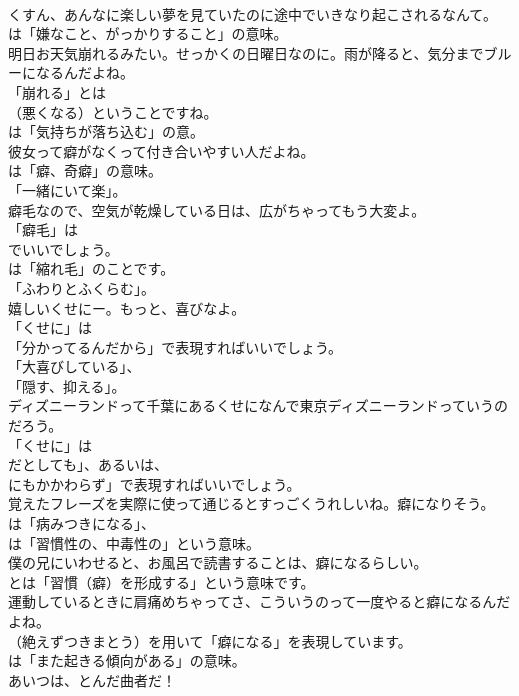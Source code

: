 \documentclass[8pt]{extreport}
\begin{document}
\begin{CJK}{UTF8}{min}
\\	くすん、あんなに楽しい夢を見ていたのに途中でいきなり起こされるなんて。 
\\	は「嫌なこと、がっかりすること」の意味。	
\\	明日お天気崩れるみたい。せっかくの日曜日なのに。雨が降ると、気分までブルーになるんだよね。 
\\	「崩れる」とは
\\	（悪くなる）ということですね。
\\	は「気持ちが落ち込む」の意。	
\\	彼女って癖がなくって付き合いやすい人だよね。 
\\	は「癖、奇癖」の意味。
\\	「一緒にいて楽」。	
\\	癖毛なので、空気が乾燥している日は、広がちゃってもう大変よ。 
\\	「癖毛」は
\\	でいいでしょう。
\\	は「縮れ毛」のことです。
\\	「ふわりとふくらむ」。	
\\	嬉しいくせにー。もっと、喜びなよ。 
\\	「くせに」は
\\	「分かってるんだから」で表現すればいいでしょう。
\\	「大喜びしている」、
\\	「隠す、抑える」。	
\\	ディズニーランドって千葉にあるくせになんで東京ディズニーランドっていうのだろう。 
\\	「くせに」は
\\	だとしても」、あるいは、
\\	にもかかわらず」で表現すればいいでしょう。	
\\	覚えたフレーズを実際に使って通じるとすっごくうれしいね。癖になりそう。 
\\	は「病みつきになる」、
\\	は「習慣性の、中毒性の」という意味。	
\\	僕の兄にいわせると、お風呂で読書することは、癖になるらしい。 
\\	とは「習慣（癖）を形成する」という意味です。	
\\	運動しているときに肩痛めちゃってさ、こういうのって一度やると癖になるんだよね。 
\\	（絶えずつきまとう）を用いて「癖になる」を表現しています。
\\	は「また起きる傾向がある」の意味。	
\\	あいつは、とんだ曲者だ！ 

\end{CJK}
\end{document}
